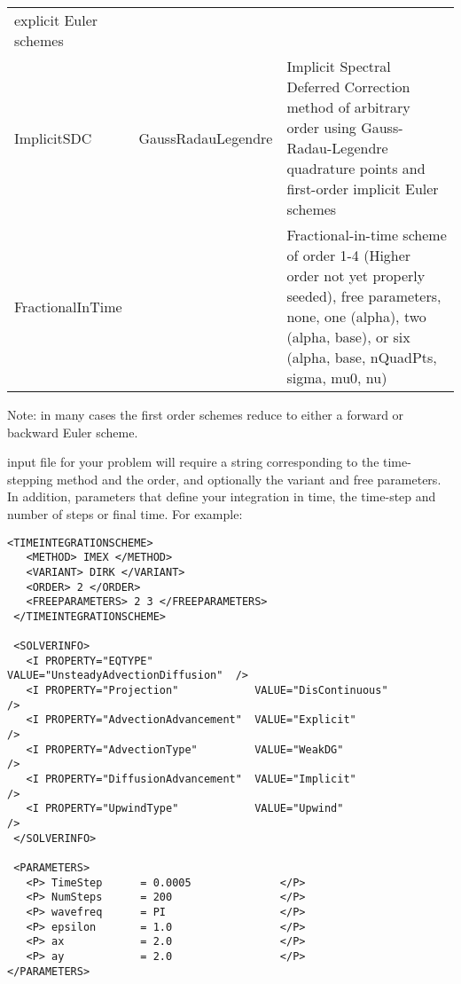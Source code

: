\begin{center}
\begin{tabular}{p{2.5cm}p{1cm}p{10cm}}
                                   explicit Euler schemes\\
ImplicitSDC & GaussRadauLegendre & Implicit Spectral Deferred Correction method of arbitrary order
                                   using Gauss-Radau-Legendre quadrature points and first-order
                                   implicit Euler schemes\\
FractionalInTime &            & Fractional-in-time scheme of order 1-4
                              (Higher order not yet properly seeded),
                              free parameters, none,
                              one (alpha),
                              two (alpha, base), or
                              six (alpha, base, nQuadPts, sigma, mu0, nu) \\
                    
\bottomrule
\end{tabular}
\end{center}

Note: in many cases the first order schemes reduce to either a forward
or backward Euler scheme.

{\nek} input file for your problem will require a string corresponding
to the time-stepping method and the order, and optionally the variant and
free parameters. In addition, parameters that define your integration
in time, the time-step and number of steps or final time. For
example:\\
\begin{lstlisting}[style=XMLStyle]
 <TIMEINTEGRATIONSCHEME>
   <METHOD> IMEX </METHOD>
   <VARIANT> DIRK </VARIANT>
   <ORDER> 2 </ORDER>
   <FREEPARAMETERS> 2 3 </FREEPARAMETERS>
 </TIMEINTEGRATIONSCHEME>

 <SOLVERINFO>
   <I PROPERTY="EQTYPE"                VALUE="UnsteadyAdvectionDiffusion"  />
   <I PROPERTY="Projection"            VALUE="DisContinuous"               />
   <I PROPERTY="AdvectionAdvancement"  VALUE="Explicit"                    />
   <I PROPERTY="AdvectionType"         VALUE="WeakDG"                      />
   <I PROPERTY="DiffusionAdvancement"  VALUE="Implicit"                    />
   <I PROPERTY="UpwindType"            VALUE="Upwind"                      />
 </SOLVERINFO>
 
 <PARAMETERS>
   <P> TimeStep      = 0.0005              </P>
   <P> NumSteps      = 200                 </P>
   <P> wavefreq      = PI                  </P>
   <P> epsilon       = 1.0                 </P>
   <P> ax            = 2.0                 </P>
   <P> ay            = 2.0                 </P>
</PARAMETERS>
\end{lstlisting}

